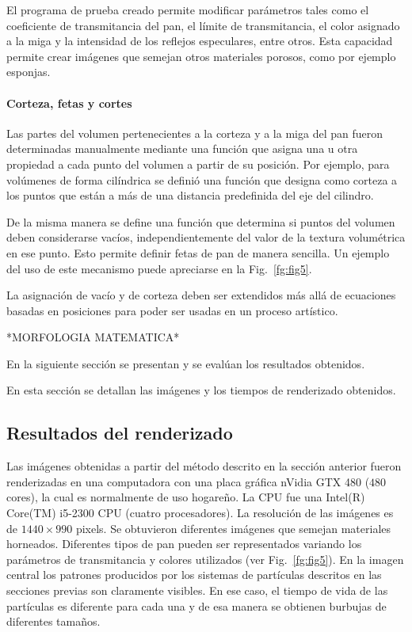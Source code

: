\documentclass[spanish,a4paper,11pt,oneside,links]{report}
\begin{document}
El programa de prueba creado permite modificar parámetros tales como el coeficiente de transmitancia del pan, el límite de transmitancia, el color asignado a la miga y la intensidad de los reflejos especulares, entre otros. Esta capacidad permite crear imágenes que semejan otros
materiales porosos, como por ejemplo esponjas.

\paragraph{Corteza, fetas y cortes}

Las partes del volumen pertenecientes a la corteza y a la miga del pan fueron determinadas manualmente mediante una función que asigna una u otra propiedad a cada punto del volumen a partir de su posición. Por ejemplo, para volúmenes de forma cilíndrica se definió una función que designa como corteza a los puntos que están a más de una distancia predefinida del eje del cilindro.

De la misma manera se define una función que determina si puntos del volumen deben considerarse vacíos, independientemente del valor de la textura volumétrica en ese punto. Esto permite definir fetas de pan de manera sencilla. Un ejemplo del uso de este mecanismo puede apreciarse
en la Fig.~\ref{fg:fig5}.

La asignación de vacío y de corteza deben ser extendidos más allá de ecuaciones basadas en posiciones para poder ser usadas en un proceso artístico.

*MORFOLOGIA MATEMATICA*


En la siguiente sección se presentan y se evalúan los resultados obtenidos.

En esta sección se detallan las imágenes y los tiempos de renderizado obtenidos. 

\subsection{Resultados del renderizado}

Las imágenes obtenidas a partir del método descrito en la sección anterior fueron renderizadas en una computadora con una placa gráfica nVidia GTX 480 ($480$ cores), la cual es normalmente de uso hogareño. La CPU fue una Intel(R) Core(TM) i5-2300 CPU (cuatro procesadores). La resolución de las imágenes es de $1440\times990$ pixels. 
Se obtuvieron diferentes imágenes que semejan materiales horneados. Diferentes tipos de pan pueden ser representados variando los parámetros de transmitancia y colores utilizados (ver Fig.~\ref{fg:fig5}). En la imagen central los patrones producidos por los sistemas de partículas descritos en las secciones previas son claramente visibles. En ese caso, el tiempo de vida de las partículas es diferente para cada una y de esa manera se obtienen burbujas de
diferentes tamaños.
\end{document}
